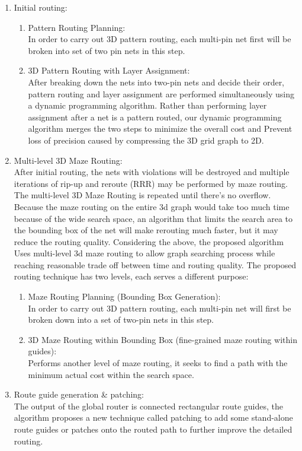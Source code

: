 \documentclass[conference]{IEEEtran}
\begin{document}
\begin{enumerate}
	\item Initial routing:
    \begin{enumerate}
    	\item Pattern Routing Planning: \\
        In order to carry out 3D pattern routing, each multi-pin net first will be broken into set of two pin nets in this step.        
        \item 3D Pattern Routing with Layer Assignment: \\
        After breaking down the nets into two-pin nets and decide their order,
        pattern routing and layer assignment are performed simultaneously using a dynamic programming algorithm.
        Rather than performing layer assignment after a net is a pattern routed,
        our dynamic programming algorithm merges the two steps to minimize the overall cost
        and Prevent loss of precision caused by compressing the 3D grid graph to 2D.
    \end{enumerate}
    \item Multi-level 3D Maze Routing: \\
    After initial routing, the nets with violations will be destroyed and multiple iterations of rip-up and reroute (RRR) may be performed by maze routing. The multi-level 3D Maze Routing is repeated until there's no overflow. Because the maze routing on the entire 3d  graph would take too much time because of the wide search space, an algorithm that limits the search area to the bounding box of the net will make rerouting much faster, but it may reduce the routing quality.
    Considering the above, the proposed algorithm Uses multi-level 3d maze routing to allow graph searching process while reaching reasonable trade off between time and routing quality.
    The proposed routing technique has two levels, each serves a different purpose:
    \begin{enumerate}
    	\item  Maze Routing Planning (Bounding Box Generation): \\
        In order to carry out 3D pattern routing, each multi-pin net will first be broken down into a set of two-pin nets in this step.        
        \item 3D Maze Routing within Bounding Box (fine-grained maze routing within guides): \\
        Performs another level of maze routing, it seeks to find a path with the minimum
        actual cost within the search space.
    \end{enumerate}
	\item Route guide generation \& patching: \\
    The output of the global router is connected rectangular route guides, the algorithm proposes a new technique called patching to add some stand-alone route guides or patches onto the routed path to further improve the detailed routing.
\end{enumerate}
\end{document}
